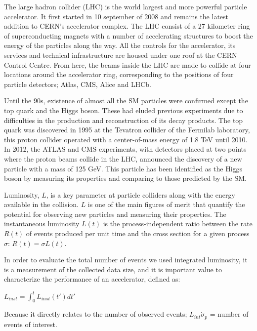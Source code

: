 \documentclass[final,12p]{article}
\begin{document}
The large hadron collider (LHC) is the world largest and more powerful particle accelerator. It first started in 10 september of 2008 and remains the latest addition to CERN's accelerator complex. The LHC consist of a 27 kilometer ring of superconducting magnets with a number of accelerating structures to boost the energy of the particles along the way. All the controls for the accelerator, its services and technical infrastructure are housed under one roof at the CERN Control Centre. From here, the beams inside the LHC are made to collide at four locations around the accelerator ring, corresponding to the positions of four particle detectors; Atlas, CMS, Alice and LHCb.

Until the 90s, existence of almost all the SM particles were confirmed except the top quark and the Higgs boson. 
These had eluded previous experiments due to difficulties in the production and reconstruction of its decay products.
The top quark was discovered in 1995 at the Tevatron collider of the Fermilab laboratory, this proton collider operated with a center-of-mass energy of 1.8 TeV until 2010.
In 2012, the ATLAS and CMS experiments, with detectors placed at two points where the proton beams collide in the LHC, announced the discovery of a new particle with a mass of 125 GeV.
This particle has been identified as the Higgs boson by measuring its properties and comparing to those predicted by the SM.


Luminosity, $L$, is a key parameter at particle colliders along with the energy available in the collision.
$L$ is one of the  main figures of merit that quantify the potential for observing new particles and measuring their properties.
The instantaneous luminosity $L(t)$ is the process-independent ratio between the rate $R(t)$ of events produced per unit time and the cross section for a given process $\sigma$:  $R(t) = \sigma L(t)$.

In order to evaluate the total number of events we used integrated luminosity, it is a measurement of the collected data size, and it is important value to characterize the performance of an accelerator, defined as: \\ 


\begin{center}
$L_{inst} = \int _{0}^{t} L_{inst}(t') dt'$ \\ 
\end{center}


Because it directly relates to the number of observed events; $L_{int} \dot \sigma_{p}$ = number of events of interest. \\
\end{document}
